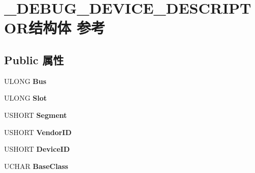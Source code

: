 \hypertarget{struct___d_e_b_u_g___d_e_v_i_c_e___d_e_s_c_r_i_p_t_o_r}{}\section{\+\_\+\+D\+E\+B\+U\+G\+\_\+\+D\+E\+V\+I\+C\+E\+\_\+\+D\+E\+S\+C\+R\+I\+P\+T\+O\+R结构体 参考}
\label{struct___d_e_b_u_g___d_e_v_i_c_e___d_e_s_c_r_i_p_t_o_r}
\subsection*{Public 属性}
\begin{DoxyCompactItemize}
\item 
\mbox{\label{struct___d_e_b_u_g___d_e_v_i_c_e___d_e_s_c_r_i_p_t_o_r_a82fa6ad2e660edc061cf37cdc08064d8}} 
U\+L\+O\+NG {\bfseries Bus}
\item 
\mbox{\label{struct___d_e_b_u_g___d_e_v_i_c_e___d_e_s_c_r_i_p_t_o_r_a9d2c5fc101f2b39cc865ab52091e3dd1}} 
U\+L\+O\+NG {\bfseries Slot}
\item 
\mbox{\label{struct___d_e_b_u_g___d_e_v_i_c_e___d_e_s_c_r_i_p_t_o_r_ab0b6e65ea1f2724221c7744448fb9b50}} 
U\+S\+H\+O\+RT {\bfseries Segment}
\item 
\mbox{\label{struct___d_e_b_u_g___d_e_v_i_c_e___d_e_s_c_r_i_p_t_o_r_aa8c46fed7ccb3cdf37be77af53aa7296}} 
U\+S\+H\+O\+RT {\bfseries Vendor\+ID}
\item 
\mbox{\label{struct___d_e_b_u_g___d_e_v_i_c_e___d_e_s_c_r_i_p_t_o_r_a7e5be6c07cadd7284f620b8cf6779053}} 
U\+S\+H\+O\+RT {\bfseries Device\+ID}
\item 
\mbox{\label{struct___d_e_b_u_g___d_e_v_i_c_e___d_e_s_c_r_i_p_t_o_r_ab8d8551906b8be69777e19242054637c}} 
U\+C\+H\+AR {\bfseries Base\+Class}
\item 
\mbox{\label{struct___d_e_b_u_g___d_e_v_i_c_e___d_e_s_c_r_i_p_t_o_r_a6931afdbcd55a907f73ab07410f50c7d}} 

\end{DoxyCompactItemize}
